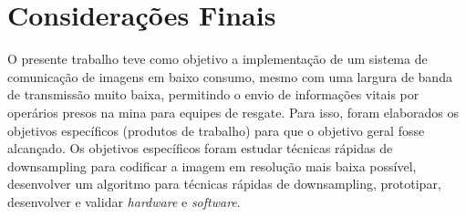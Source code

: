 \chapter[Considerações Finais]{Considerações Finais}

O presente trabalho teve como objetivo a implementação de um sistema de comunicação de imagens em baixo consumo, mesmo com uma largura de banda de transmissão muito baixa, permitindo o envio de informações vitais por operários presos na mina para equipes de resgate. Para isso, foram elaborados os objetivos específicos (produtos de trabalho) para que o objetivo geral fosse alcançado. Os objetivos específicos foram estudar técnicas rápidas de downsampling para codificar a imagem em resolução mais baixa possível, desenvolver um algoritmo para técnicas rápidas de downsampling, prototipar, desenvolver e validar \textit{hardware} e \textit{software}.

